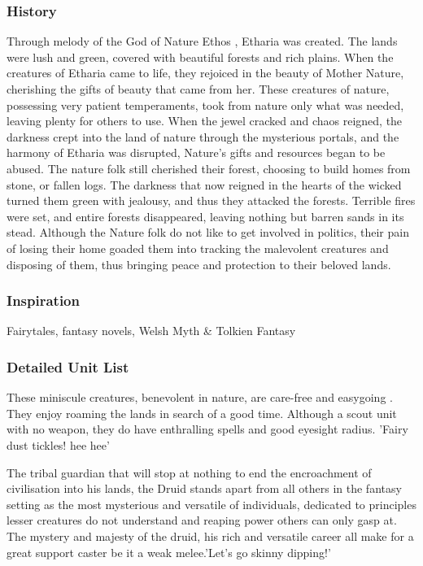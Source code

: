 \documentclass[a4paper]{article}
\begin{document}
\subsubsection{History}

Through melody of the God of Nature Ethos , Etharia was created. The lands were lush and green, covered with beautiful forests and rich plains. When the creatures of Etharia came to life, they rejoiced in the beauty of Mother Nature, cherishing the gifts of beauty that came from her. These creatures of nature, possessing very patient temperaments, took from nature only what was needed, leaving plenty for others to use. When the jewel cracked and chaos reigned, the darkness crept into the land of nature through the mysterious portals, and the harmony of Etharia was disrupted, Nature's gifts and resources began to be abused. The nature folk still cherished their forest, choosing to build homes from stone, or fallen logs. The darkness that now reigned in the hearts of the wicked turned them green with jealousy, and thus they attacked the forests. Terrible fires were set, and entire forests disappeared, leaving nothing but barren sands in its stead. Although the Nature folk do not like to get involved in politics, their pain of losing their home goaded them into tracking the malevolent creatures and disposing of them, thus bringing peace and protection to their beloved lands. 

\subsubsection{Inspiration}
Fairytales, fantasy novels, Welsh Myth \& Tolkien Fantasy

\subsubsection{Detailed Unit List}

These miniscule creatures, benevolent in nature, are care-free and easygoing . They enjoy roaming the lands in search of a good time. Although a scout unit with no weapon, they do have enthralling spells and good eyesight radius. 'Fairy dust tickles! hee hee'

The tribal guardian that will stop at nothing to end the encroachment of civilisation into his lands, the Druid stands apart from all others in the fantasy setting as the most mysterious and versatile of individuals, dedicated to principles lesser creatures do not understand and reaping power others can only gasp at. The mystery and majesty of the druid, his rich and versatile career all make for a great support caster be it a weak melee.'Let's go skinny dipping!'
\end{document}
